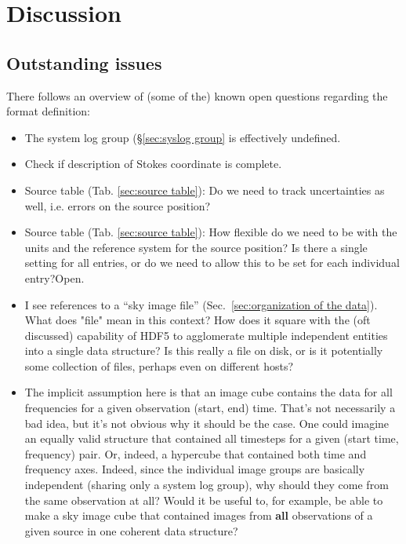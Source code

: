 \documentclass[a4paper,10pt,bibtotoc]{scrartcl}
\begin{document}

\section{Discussion}
\label{sec:discussion}

\subsection{Outstanding issues}
\label{sec:open-questions}

There follows an overview of (some of the) known open questions regarding the
format definition:

\begin{itemize}

  \item{The system log group (\S \ref{sec:syslog group} is effectively
  undefined.}

  \item{Check if description of Stokes coordinate is complete.}

  \item{Source table (Tab. \ref{sec:source table}): Do we need to track
  uncertainties as well, i.e. errors on the source position?}

  \item{Source table (Tab. \ref{sec:source table}): How flexible do we need
  to be with the units and the reference system for the source position? Is
  there a single setting for all entries, or do we need to allow this to be
  set for each individual entry?}{Open.}

  \item{I see references to a ``sky image file'' (Sec.~\ref{sec:organization
  of the data}). What does "file" mean in this context?  How does it square
  with the (oft discussed) capability of HDF5 to agglomerate multiple
  independent entities into a single data structure? Is this really a file on
  disk, or is it potentially some collection of files, perhaps even on
  different hosts?}

  \item{The implicit assumption here is that an image cube contains the data
  for all frequencies for a given observation (start, end) time. That's not
  necessarily a bad idea, but it's not obvious why it should be the case.  One
  could imagine an equally valid structure that contained all timesteps for a
  given (start time, frequency) pair. Or, indeed, a hypercube that contained
  both time and frequency axes. Indeed, since the individual image groups are
  basically independent (sharing only a system log group), why should they
  come from the same observation at all? Would it be useful to, for example,
  be able to make a sky image cube that contained images from \textbf{all}
  observations of a given source in one coherent data structure?}


\end{itemize}
\end{document}
